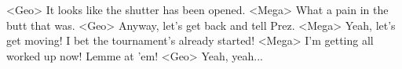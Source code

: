 <Geo> It looks like the shutter has been opened. 
<Mega> What a pain in the butt that was. 
<Geo> Anyway, let's get back and tell Prez. 
<Mega> Yeah, let's get moving! 
I bet the tournament's already started! 
<Mega> I'm getting all worked up now! Lemme at 'em! 
<Geo> Yeah, yeah... 
